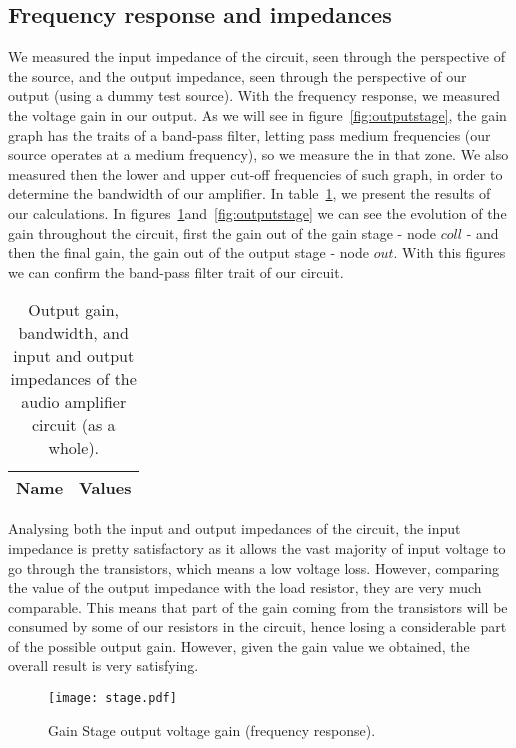 \subsection{Frequency response and impedances}
We measured the input impedance of the circuit, seen through the perspective of the source, and the output impedance, seen through the perspective of our output (using a dummy test source). With the frequency response, we measured the voltage gain in our output. As we will see in figure~\ref{fig:outputstage}, the gain graph has the traits of a band-pass filter, letting pass medium frequencies (our source operates at a medium frequency), so we measure the in that zone. We also measured then the lower and upper cut-off frequencies of such graph, in order to determine the bandwidth of our amplifier. In table~\ref{tab:main}, we present the results of our calculations. In figures~\ref{fig:gainstage}and~\ref{fig:outputstage} we can see the evolution of the gain throughout the circuit, first the gain out of the gain stage - node $coll$ - and then the final gain, the gain out of the output stage - node $out$. With this figures we can confirm the band-pass filter trait of our circuit.

\begin{table}[h]
  \centering
  \begin{tabular}{|l|r|}
    \hline    
    {\bf Name} & {\bf Values} \\ \hline
    
         
  \end{tabular}
  \caption{Output gain, bandwidth, and input and output impedances of the audio amplifier circuit (as a whole).}
  \label{tab:main}
\end{table}

Analysing both the input and output impedances of the circuit, the input impedance is pretty satisfactory as it allows the vast majority of input voltage to go through the transistors, which means a low voltage loss. However, comparing the value of the output impedance with the load resistor, they are very much comparable. This means that part of the gain coming from the transistors will be consumed by some of our resistors in the circuit, hence losing a considerable part of the possible output gain. However, given the gain value we obtained, the overall result is very satisfying.

\begin{figure}[!h] \centering
\texttt{[image: stage.pdf]}
\caption{Gain Stage output voltage gain (frequency response).}
\label{fig:gainstage}
\end{figure}

